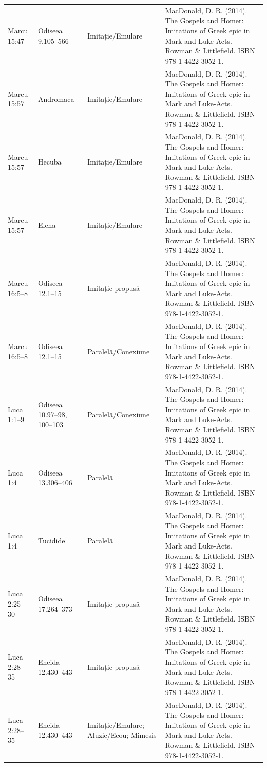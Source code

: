 \documentclass[12pt,a4paper,twoside,openany]{book}
\begin{document}
\begin{longtable}{L{1.4cm}L{1.7cm}L{3.1cm}L{8.4cm}}
Marcu 15:47 & Odiseea 9.105–566 & Imitație/Emulare & MacDonald, D. R. (2014). The Gospels and Homer: Imitations of Greek epic in Mark and Luke-Acts. Rowman \& Littlefield. ISBN 978-1-4422-3052-1. \\
Marcu 15:57 & Andromaca & Imitație/Emulare & MacDonald, D. R. (2014). The Gospels and Homer: Imitations of Greek epic in Mark and Luke-Acts. Rowman \& Littlefield. ISBN 978-1-4422-3052-1. \\
Marcu 15:57 & Hecuba & Imitație/Emulare & MacDonald, D. R. (2014). The Gospels and Homer: Imitations of Greek epic in Mark and Luke-Acts. Rowman \& Littlefield. ISBN 978-1-4422-3052-1. \\
Marcu 15:57 & Elena & Imitație/Emulare & MacDonald, D. R. (2014). The Gospels and Homer: Imitations of Greek epic in Mark and Luke-Acts. Rowman \& Littlefield. ISBN 978-1-4422-3052-1. \\
Marcu 16:5–8 & Odiseea 12.1–15 & Imitație propusă & MacDonald, D. R. (2014). The Gospels and Homer: Imitations of Greek epic in Mark and Luke-Acts. Rowman \& Littlefield. ISBN 978-1-4422-3052-1. \\
Marcu 16:5–8 & Odiseea 12.1–15 & Paralelă/Conexiune & MacDonald, D. R. (2014). The Gospels and Homer: Imitations of Greek epic in Mark and Luke-Acts. Rowman \& Littlefield. ISBN 978-1-4422-3052-1. \\
Luca 1:1–9 & Odiseea 10.97–98, 100–103 & Paralelă/Conexiune & MacDonald, D. R. (2014). The Gospels and Homer: Imitations of Greek epic in Mark and Luke-Acts. Rowman \& Littlefield. ISBN 978-1-4422-3052-1. \\
Luca 1:4 & Odiseea 13.306–406 & Paralelă & MacDonald, D. R. (2014). The Gospels and Homer: Imitations of Greek epic in Mark and Luke-Acts. Rowman \& Littlefield. ISBN 978-1-4422-3052-1. \\
Luca 1:4 & Tucidide & Paralelă & MacDonald, D. R. (2014). The Gospels and Homer: Imitations of Greek epic in Mark and Luke-Acts. Rowman \& Littlefield. ISBN 978-1-4422-3052-1. \\
Luca 2:25–30 & Odiseea 17.264–373 & Imitație propusă & MacDonald, D. R. (2014). The Gospels and Homer: Imitations of Greek epic in Mark and Luke-Acts. Rowman \& Littlefield. ISBN 978-1-4422-3052-1. \\
Luca 2:28–35 & Eneida 12.430–443 & Imitație propusă & MacDonald, D. R. (2014). The Gospels and Homer: Imitations of Greek epic in Mark and Luke-Acts. Rowman \& Littlefield. ISBN 978-1-4422-3052-1. \\
Luca 2:28–35 & Eneida 12.430–443 & Imitație/Emulare; Aluzie/Ecou; Mimesis & MacDonald, D. R. (2014). The Gospels and Homer: Imitations of Greek epic in Mark and Luke-Acts. Rowman \& Littlefield. ISBN 978-1-4422-3052-1. \\

\end{longtable}
\end{document}
